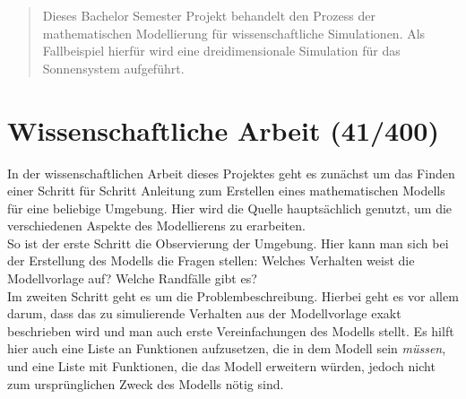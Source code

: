 \documentclass[conference,compsoc]{IEEEtran}
\begin{document}




\maketitle


\begin{abstract}
Dieses Bachelor Semester Projekt behandelt den Prozess der mathematischen Modellierung für wissenschaftliche Simulationen. Als Fallbeispiel hierfür wird eine dreidimensionale Simulation für das Sonnensystem aufgeführt.
\end{abstract}


%
\IEEEpeerreviewmaketitle



\section{Wissenschaftliche Arbeit (41/400)} 
In der wissenschaftlichen Arbeit dieses Projektes geht es zunächst um das Finden einer Schritt für Schritt Anleitung zum Erstellen eines mathematischen Modells für eine beliebige Umgebung. Hier wird die Quelle \cite{ComputationalModelsIntroduction} hauptsächlich genutzt, um die verschiedenen Aspekte des Modellierens zu erarbeiten.\\
So ist der erste Schritt die Observierung der Umgebung. Hier kann man sich bei der Erstellung des Modells die Fragen stellen: Welches Verhalten weist die Modellvorlage auf? Welche Randfälle gibt es? \\
Im zweiten Schritt geht es um die Problembeschreibung. Hierbei geht es vor allem darum, dass das zu simulierende Verhalten aus der Modellvorlage exakt beschrieben wird und man auch erste Vereinfachungen des Modells stellt. Es hilft hier auch eine Liste an Funktionen aufzusetzen, die in dem Modell sein \emph{müssen}, und eine Liste mit Funktionen, die das Modell erweitern würden, jedoch nicht zum ursprünglichen Zweck des Modells nötig sind.
\end{document}
